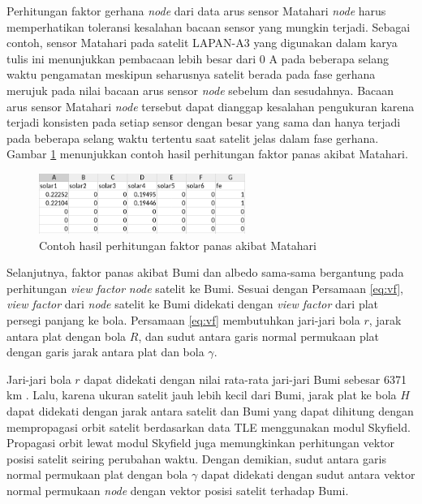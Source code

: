 Perhitungan faktor gerhana \textit{node} dari data arus sensor Matahari
\textit{node} harus memperhatikan toleransi kesalahan bacaan sensor yang
mungkin terjadi. Sebagai contoh, sensor Matahari pada satelit LAPAN-A3 yang
digunakan dalam karya tulis ini menunjukkan pembacaan lebih besar dari 0 A pada
beberapa selang waktu pengamatan meskipun seharusnya satelit berada pada fase
gerhana merujuk pada nilai bacaan arus sensor \textit{node} sebelum dan
sesudahnya. Bacaan arus sensor Matahari \textit{node} tersebut dapat dianggap
kesalahan pengukuran karena terjadi konsisten pada setiap sensor dengan besar
yang sama dan hanya terjadi pada beberapa selang waktu tertentu saat satelit
jelas dalam fase gerhana. Gambar \ref{fig:solarfactor} menunjukkan contoh hasil perhitungan faktor panas akibat Matahari. 

\begin{figure}[H]
\setlength{}
\begin{center}
\includegraphics[width=0.6\textwidth]{fig/solarfactor.png}
\caption{Contoh hasil perhitungan faktor panas akibat Matahari}
\label{fig:solarfactor}
\end{center}
\end{figure}

Selanjutnya, faktor panas akibat Bumi dan albedo sama-sama bergantung pada
perhitungan \textit{view factor} \textit{node} satelit ke Bumi. Sesuai dengan
Persamaan \ref{eq:vf}, \textit{view factor} dari \textit{node} satelit ke Bumi
didekati dengan \textit{view factor} dari plat persegi panjang ke bola. Persamaan \ref{eq:vf} membutuhkan jari-jari bola $r$, jarak antara plat dengan bola $R$, dan sudut antara garis normal permukaan plat dengan garis jarak antara plat dan bola $\gamma$. 

Jari-jari bola $r$ dapat didekati dengan nilai rata-rata jari-jari Bumi sebesar
6371 km \cite{moritz}. Lalu, karena ukuran satelit jauh lebih kecil dari Bumi,
jarak plat ke bola $H$ dapat didekati dengan jarak antara satelit dan Bumi yang
dapat dihitung dengan mempropagasi orbit satelit berdasarkan data TLE
menggunakan modul Skyfield. Propagasi orbit lewat modul Skyfield juga
memungkinkan perhitungan vektor posisi satelit seiring perubahan waktu. Dengan
demikian, sudut antara garis normal permukaan plat dengan bola $\gamma$ dapat
didekati dengan sudut antara vektor normal permukaan \textit{node} dengan
vektor posisi satelit terhadap Bumi. 

